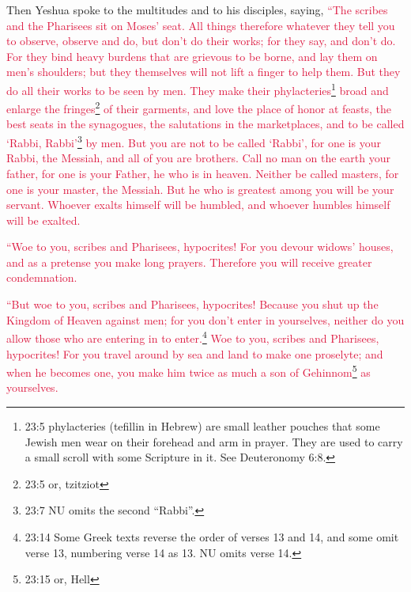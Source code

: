 \mychapter{} \myverse*{}Then Yeshua spoke to the multitudes and to his disciples,
\myverse{}saying,
\textcolor{crimson}{“The scribes and the Pharisees sit on Moses’ seat.
}
\myverse{}\textcolor{crimson}{All things therefore whatever they tell you to observe, observe and do,
	but don’t do their works; for they say, and don’t do.
}
\myverse{}\textcolor{crimson}{For they bind heavy burdens that are grievous to be borne, and lay them
	on men’s shoulders; but they themselves will not lift a finger to help them.
}
\myverse{}\textcolor{crimson}{But they do all their works to be seen by men. They make their phylacteries}\footnote{23:5 phylacteries (tefillin in Hebrew) are small leather pouches that some Jewish men wear on their
	forehead and arm in prayer. They are used to carry a small scroll with some Scripture in it. See
	Deuteronomy 6:8.}
\textcolor{crimson}{broad and enlarge the fringes}\footnote{23:5 or, tzitziot}
\textcolor{crimson}{of their garments,
}
\myverse{}\textcolor{crimson}{and love the place of honor at feasts, the best seats in the synagogues,
}
\myverse{}\textcolor{crimson}{the salutations in the marketplaces, and to be called ‘Rabbi, Rabbi’}\footnote{23:7 NU omits the second “Rabbi”.
}
\textcolor{crimson}{by men.
}
\myverse{}\textcolor{crimson}{But you are not to be called ‘Rabbi’, for one is your Rabbi, the Messiah,
	and all of you are brothers.
}
\myverse{}\textcolor{crimson}{Call no man on the earth your father, for one is your Father, he who is
	in heaven.
}
\myverse{}\textcolor{crimson}{Neither be called masters, for one is your master, the Messiah.
}
\myverse{}\textcolor{crimson}{But he who is greatest among you will be your servant.
}
\myverse{}\textcolor{crimson}{Whoever exalts himself will be humbled, and whoever humbles himself will
	be exalted.}

\myverse{}\textcolor{crimson}{“Woe to you, scribes and Pharisees, hypocrites! For you
	devour widows’ houses, and as a pretense you make long prayers. Therefore you will receive greater condemnation.}

\myverse{}\textcolor{crimson}{“But woe to you, scribes and Pharisees, hypocrites! Because
	you shut up the Kingdom of Heaven against men; for you don’t enter in yourselves, neither do you allow
	those who are entering in to enter.}\footnote{23:14 Some Greek texts reverse the order of verses 13 and 14, and some omit verse 13, numbering verse
	14 as 13. NU omits verse 14.}
\myverse{}\textcolor{crimson}{Woe to you, scribes and Pharisees, hypocrites! For you travel around
	by sea and land to make one proselyte; and when he becomes one, you make him twice as much a son of Gehinnom}\footnote{23:15 or, Hell}
\textcolor{crimson}{as yourselves.
}


